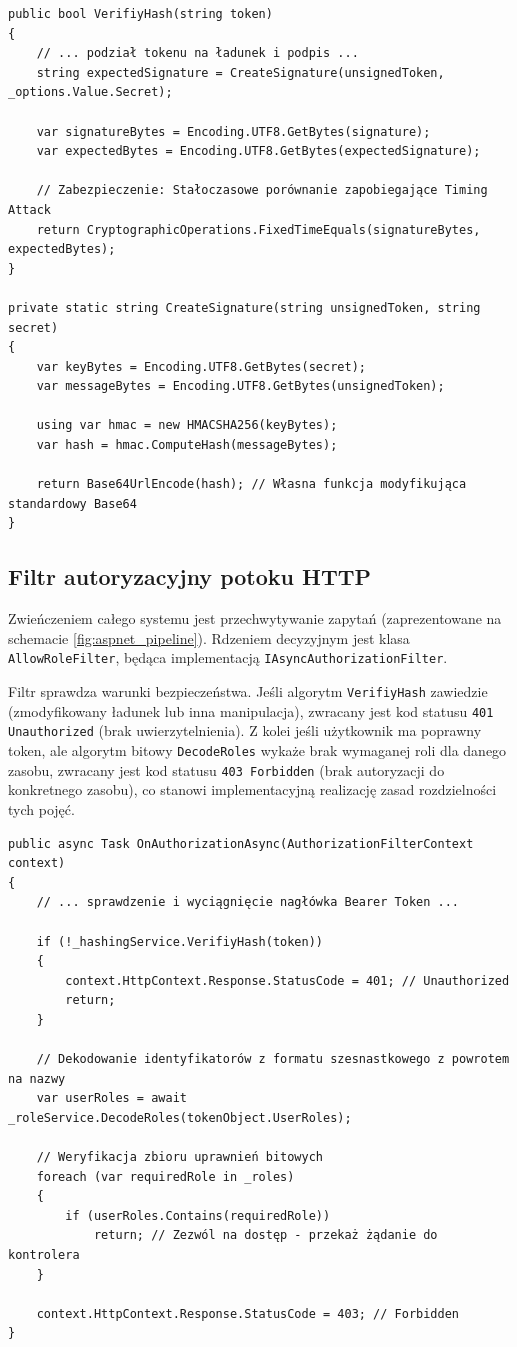 \documentclass{SGGW-thesis}
\begin{document}
\begin{verbatim}
public bool VerifiyHash(string token)
{
    // ... podział tokenu na ładunek i podpis ...
    string expectedSignature = CreateSignature(unsignedToken, _options.Value.Secret);

    var signatureBytes = Encoding.UTF8.GetBytes(signature);
    var expectedBytes = Encoding.UTF8.GetBytes(expectedSignature);

    // Zabezpieczenie: Stałoczasowe porównanie zapobiegające Timing Attack
    return CryptographicOperations.FixedTimeEquals(signatureBytes, expectedBytes);
}

private static string CreateSignature(string unsignedToken, string secret)
{
    var keyBytes = Encoding.UTF8.GetBytes(secret);
    var messageBytes = Encoding.UTF8.GetBytes(unsignedToken);

    using var hmac = new HMACSHA256(keyBytes);
    var hash = hmac.ComputeHash(messageBytes);
    
    return Base64UrlEncode(hash); // Własna funkcja modyfikująca standardowy Base64
}
\end{verbatim}

\subsection{Filtr autoryzacyjny potoku HTTP}

Zwieńczeniem całego systemu jest przechwytywanie zapytań (zaprezentowane na schemacie \ref{fig:aspnet_pipeline}). Rdzeniem decyzyjnym jest klasa \texttt{AllowRoleFilter}, będąca implementacją \texttt{IAsyncAuthorizationFilter}.

Filtr sprawdza warunki bezpieczeństwa. Jeśli algorytm \texttt{VerifiyHash} zawiedzie (zmodyfikowany ładunek lub inna manipulacja), zwracany jest kod statusu \texttt{401 Unauthorized} (brak uwierzytelnienia). Z kolei jeśli użytkownik ma poprawny token, ale algorytm bitowy \texttt{DecodeRoles} wykaże brak wymaganej roli dla danego zasobu, zwracany jest kod statusu \texttt{403 Forbidden} (brak autoryzacji do konkretnego zasobu), co stanowi implementacyjną realizację zasad rozdzielności tych pojęć.

\begin{verbatim}
public async Task OnAuthorizationAsync(AuthorizationFilterContext context)
{
    // ... sprawdzenie i wyciągnięcie nagłówka Bearer Token ...
    
    if (!_hashingService.VerifiyHash(token))
    {
        context.HttpContext.Response.StatusCode = 401; // Unauthorized
        return;
    }

    // Dekodowanie identyfikatorów z formatu szesnastkowego z powrotem na nazwy
    var userRoles = await _roleService.DecodeRoles(tokenObject.UserRoles);
    
    // Weryfikacja zbioru uprawnień bitowych
    foreach (var requiredRole in _roles)
    {
        if (userRoles.Contains(requiredRole))
            return; // Zezwól na dostęp - przekaż żądanie do kontrolera
    }
    
    context.HttpContext.Response.StatusCode = 403; // Forbidden
}
\end{verbatim}
\end{document}
